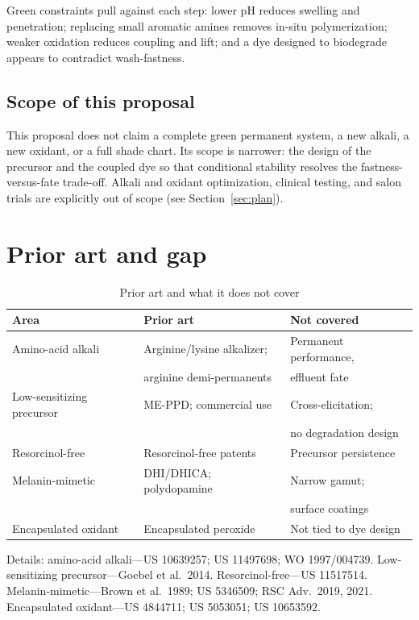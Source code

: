 \documentclass[11pt,a4paper]{article}
\begin{document}
Green constraints pull against each step: lower pH reduces swelling and penetration; replacing small aromatic amines removes in-situ polymerization; weaker oxidation reduces coupling and lift; and a dye designed to biodegrade appears to contradict wash-fastness.

\subsection{Scope of this proposal}
This proposal does not claim a complete green permanent system, a new alkali, a new oxidant, or a full shade chart. Its scope is narrower: the design of the precursor and the coupled dye so that conditional stability resolves the fastness-versus-fate trade-off. Alkali and oxidant optimization, clinical testing, and salon trials are explicitly out of scope (see Section~\ref{sec:plan}).

\section{Prior art and gap}

\begin{table}[h]
\centering
\caption{Prior art and what it does not cover}
\label{tab:priorart}
\begin{tabular}{@{}lll@{}}
\toprule
Area & Prior art & Not covered \\
\midrule
Amino-acid alkali & Arginine/lysine alkalizer; & Permanent performance, \\
& arginine demi-permanents & effluent fate \\
Low-sensitizing precursor & ME-PPD; commercial use & Cross-elicitation; \\
& & no degradation design \\
Resorcinol-free & Resorcinol-free patents & Precursor persistence \\
Melanin-mimetic & DHI/DHICA; polydopamine & Narrow gamut; \\
& & surface coatings \\
Encapsulated oxidant & Encapsulated peroxide & Not tied to dye design \\
\bottomrule
\end{tabular}
\end{table}

Details: amino-acid alkali---US 10639257; US 11497698; WO 1997/004739. Low-sensitizing precursor---Goebel et al.\ 2014. Resorcinol-free---US 11517514. Melanin-mimetic---Brown et al.\ 1989; US 5346509; RSC Adv.\ 2019, 2021. Encapsulated oxidant---US 4844711; US 5053051; US 10653592.
\end{document}
